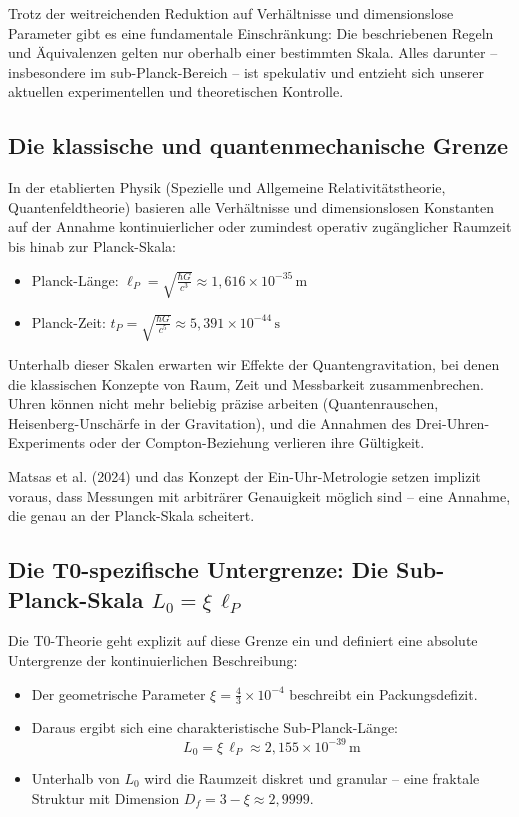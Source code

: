 Trotz der weitreichenden Reduktion auf Verhältnisse und dimensionslose Parameter gibt es eine fundamentale Einschränkung: Die beschriebenen Regeln und Äquivalenzen gelten nur oberhalb einer bestimmten Skala. Alles darunter – insbesondere im sub-Planck-Bereich – ist spekulativ und entzieht sich unserer aktuellen experimentellen und theoretischen Kontrolle.

\subsection{Die klassische und quantenmechanische Grenze}

In der etablierten Physik (Spezielle und Allgemeine Relativitätstheorie, Quantenfeldtheorie) basieren alle Verhältnisse und dimensionslosen Konstanten auf der Annahme kontinuierlicher oder zumindest operativ zugänglicher Raumzeit bis hinab zur Planck-Skala:
\begin{itemize}
	\item Planck-Länge: \(\ell_P = \sqrt{\frac{\hbar G}{c^3}} \approx 1{,}616 \times 10^{-35}\,\text{m}\)
	\item Planck-Zeit: \(t_P = \sqrt{\frac{\hbar G}{c^5}} \approx 5{,}391 \times 10^{-44}\,\text{s}\)
\end{itemize}

Unterhalb dieser Skalen erwarten wir Effekte der Quantengravitation, bei denen die klassischen Konzepte von Raum, Zeit und Messbarkeit zusammenbrechen. Uhren können nicht mehr beliebig präzise arbeiten (Quantenrauschen, Heisenberg-Unschärfe in der Gravitation), und die Annahmen des Drei-Uhren-Experiments oder der Compton-Beziehung verlieren ihre Gültigkeit.

Matsas et al. (2024) und das Konzept der Ein-Uhr-Metrologie setzen implizit voraus, dass Messungen mit arbiträrer Genauigkeit möglich sind – eine Annahme, die genau an der Planck-Skala scheitert.

\subsection{Die T0-spezifische Untergrenze: Die Sub-Planck-Skala \(L_0 = \xi \, \ell_P\)}

Die T0-Theorie geht explizit auf diese Grenze ein und definiert eine absolute Untergrenze der kontinuierlichen Beschreibung:
\begin{itemize}
	\item Der geometrische Parameter \(\xi = \frac{4}{3} \times 10^{-4}\) beschreibt ein Packungsdefizit.
	\item Daraus ergibt sich eine charakteristische Sub-Planck-Länge:
	\[
	L_0 = \xi \, \ell_P \approx 2{,}155 \times 10^{-39}\,\text{m}
	\]
	\item Unterhalb von \(L_0\) wird die Raumzeit diskret und granular – eine fraktale Struktur mit Dimension \(D_f = 3 - \xi \approx 2{,}9999\).
\end{itemize}

